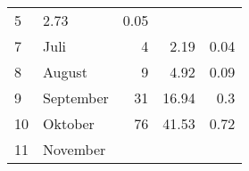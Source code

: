 \begin{longtable}{lXrrr}
       \num{5} &
       \num[round-mode=places,round-precision=2]{2.73} &
         \num[round-mode=places,round-precision=2]{0.05} \\

     7 &
     \multicolumn{1}{X}{ Juli   } &


       \num{4} &
       \num[round-mode=places,round-precision=2]{2.19} &
         \num[round-mode=places,round-precision=2]{0.04} \\

     8 &
     \multicolumn{1}{X}{ August   } &


       \num{9} &
       \num[round-mode=places,round-precision=2]{4.92} &
         \num[round-mode=places,round-precision=2]{0.09} \\

     9 &
     \multicolumn{1}{X}{ September   } &


       \num{31} &
       \num[round-mode=places,round-precision=2]{16.94} &
         \num[round-mode=places,round-precision=2]{0.3} \\

     10 &
     \multicolumn{1}{X}{ Oktober   } &


       \num{76} &
       \num[round-mode=places,round-precision=2]{41.53} &
         \num[round-mode=places,round-precision=2]{0.72} \\

     11 &
     \multicolumn{1}{X}{ November   } &



\end{longtable}
